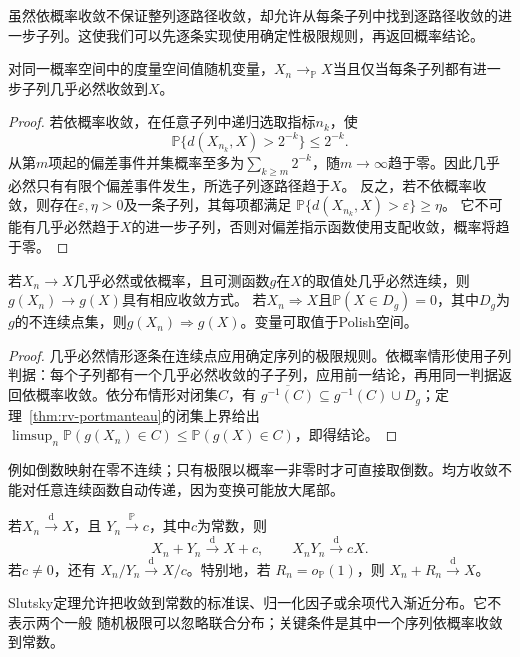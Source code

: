 虽然依概率收敛不保证整列逐路径收敛，却允许从每条子列中找到逐路径收敛的进一步子列。这使我们可以先逐条实现使用确定性极限规则，再返回概率结论。
\begin{lemma}[依概率收敛的子列判据]
 \label{lem:rv-probability-subsequence}
 对同一概率空间中的度量空间值随机变量，\(X_n\to_{\mathbb P}X\)当且仅当每条子列都有进一步子列几乎必然收敛到\(X\)。
\end{lemma}
\begin{proof}
若依概率收敛，在任意子列中递归选取指标\(n_k\)，使
\[
  \mathbb P\{d(X_{n_k},X)>2^{-k}\}\leq2^{-k}.
\]
从第\(m\)项起的偏差事件并集概率至多为\(\sum_{k\geq m}2^{-k}\)，随\(m\to\infty\)趋于零。因此几乎必然只有有限个偏差事件发生，所选子列逐路径趋于\(X\)。
反之，若不依概率收敛，则存在\(\varepsilon,\eta>0\)及一条子列，其每项都满足
\(\mathbb P\{d(X_{n_k},X)>\varepsilon\}\geq\eta\)。
它不可能有几乎必然趋于\(X\)的进一步子列，否则对偏差指示函数使用支配收敛，概率将趋于零。
\end{proof}

\begin{theorem}[连续映射]
\label{thm:rv-continuous-mapping}
若\(X_n\to X\)几乎必然或依概率，且可测函数\(g\)在\(X\)的取值处几乎必然连续，则\(g(X_n)\to g(X)\)具有相应收敛方式。
若\(X_n\Rightarrow X\)且\(\mathbb P(X\in D_g)=0\)，其中\(D_g\)为\(g\)的不连续点集，则\(g(X_n)\Rightarrow g(X)\)。变量可取值于Polish空间。
\end{theorem}
\begin{proof}
几乎必然情形逐条在连续点应用确定序列的极限规则。依概率情形使用子列判据：每个子列都有一个几乎必然收敛的子子列，应用前一结论，再用同一判据返回依概率收敛。依分布情形对闭集\(C\)，有
\(\overline{g^{-1}(C)}\subseteq g^{-1}(C)\cup D_g\)；定理~\ref{thm:rv-portmanteau}的闭集上界给出
\(\limsup_n\mathbb P(g(X_n)\in C)\leq\mathbb P(g(X)\in C)\)，即得结论。
\end{proof}
例如倒数映射在零不连续；只有极限以概率一非零时才可直接取倒数。均方收敛不能对任意连续函数自动传递，因为变换可能放大尾部。
\begin{theorem}[Slutsky定理]
  \label{thm:statistics-slutsky}
  若\(X_n\xrightarrow{\mathrm d}X\)，且
  \(Y_n\xrightarrow{\mathbb{P}}c\)，其中\(c\)为常数，则
  \[
    X_n+Y_n\xrightarrow{\mathrm d}X+c,\qquad
    X_nY_n\xrightarrow{\mathrm d}cX.
  \]
  若\(c\neq0\)，还有
  \(X_n/Y_n\xrightarrow{\mathrm d}X/c\)。特别地，若
  \(R_n=o_{\mathbb{P}}(1)\)，则
  \(X_n+R_n\xrightarrow{\mathrm d}X\)。
\end{theorem}

Slutsky定理允许把收敛到常数的标准误、归一化因子或余项代入渐近分布。它不表示两个一般
随机极限可以忽略联合分布；关键条件是其中一个序列依概率收敛到常数。

